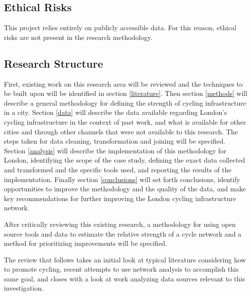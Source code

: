 \subsection{Ethical Risks}

This project relies entirely on publicly accessible data. For this reason, ethical risks are not present in the research methodology.  

\subsection{Research Structure}

First, existing work on this research area will be reviewed and the techniques to be built upon will be identified in section \ref{literature}.  Then  section \ref{methods} will describe a general methodology for defining the strength of cycling infrastructure in a city. Section \ref{data} will describe the data available regarding London's cycling infrastructure in the context of past work, and what is available for other cities and through other channels that were not available to this research. The steps taken for data cleaning, transformation and joining will be specified. Section \ref{analysis} will describe the implementation of this methodology for London, identifying the scope of the case study, defining the exact data collected and transformed and the specific tools used, and reporting the results of the implementation. Finally section \ref{conclusions} will set forth conclusions, identify opportunities to improve the methodology and the quality of the data, and make key recommendations for further improving the London cycling infrastructure network. 

After critically reviewing this existing research, a methodology for using open source tools and data to estimate the relative strength of a cycle network and a method for prioritizing improvements will be specified.

The review that follows takes an initial look at typical literature considering how to promote cycling, recent attempts to use network analysis to accomplish this same goal, and closes with a look at work analyzing data sources relevant to this investigation. 

%


